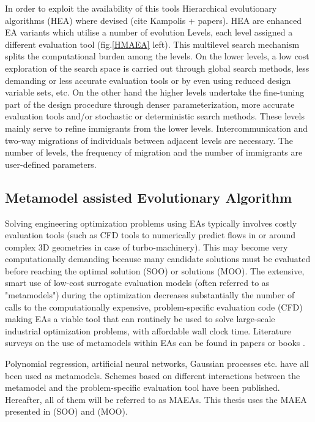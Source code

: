 In order to exploit the availability of this tools Hierarchical evolutionary algorithms (HEA) where devised (cite Kampolis + papers). HEA are enhanced EA variants which utilise a number of evolution Levels, each level assigned a different evaluation tool (fig.\ref{HMAEA} left). This multilevel search mechanism splits the computational burden among the levels. On the lower levels, a low cost exploration of the search space is carried out through global search methods, less demanding or less accurate evaluation tools or by even using reduced design variable sets, etc. On the other hand the higher levels undertake the fine-tuning part of the design procedure through denser parameterization, more accurate evaluation tools and/or stochastic or deterministic search methods. These levels mainly serve to refine immigrants from the lower levels. Intercommunication and two-way migrations of individuals between adjacent levels are necessary. The number of levels, the frequency of migration and the number of immigrants are user-defined parameters.

\subsection{Metamodel assisted Evolutionary Algorithm}

Solving engineering optimization problems using EAs typically involves costly evaluation tools (such as CFD tools to numerically predict flows in or around complex 3D geometries in case of turbo-machinery). This may become very computationally demanding because many candidate solutions must be evaluated before reaching the optimal solution (SOO) or solutions (MOO). The extensive, smart use of low-cost surrogate evaluation models (often referred to as "metamodels") during the optimization decreases substantially the number of calls to the computationally expensive, problem-specific evaluation code (CFD) making EAs a viable tool that can routinely be used to solve large-scale industrial optimization problems, with affordable wall clock time. Literature surveys on the use of metamodels within EAs can be found in papers \cite{LTT_2_020,Jin2002,LTT_2_027} or books \cite{KEANEbook}.


Polynomial regression, artificial neural networks, Gaussian processes etc. have all been used as metamodels.  Schemes based on different interactions between the metamodel and the problem-specific evaluation tool have been published. Hereafter, all of them will be referred to as MAEAs. This thesis uses the MAEA presented in \cite{LTT_2_018} (SOO) and \cite{LTT_2_029} (MOO). 

